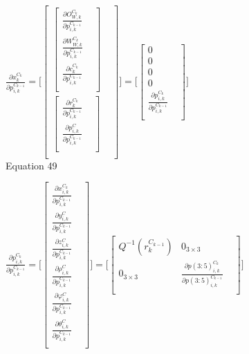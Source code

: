 $\frac{\partial x_{k}^{C_{k}}}{\partial p_{i,k}^{C_{k-1 }}}=\lbrack 
\begin{bmatrix}
\begin{bmatrix}
\frac{\partial O_{W,k}^{C_{k}}}{\partial p_{i,k}^{C_{k-1 }}} & \\
\frac{\partial W_{W,k}^{C_{k}}}{\partial p_{i,k}^{C_{k-1 }}} & \\
\frac{\partial c_{k}^{C_{k}}}{\partial p_{i,k}^{C_{k-1 }}} & \\
\end{bmatrix}
 & \\
\begin{bmatrix}
\frac{\partial r_{k}^{C_{k}}}{\partial p_{i,k}^{C_{k-1 }}} & \\
\frac{\partial p_{i, k}^{C}}{\partial p_{i,k}^{C_{k-1 }}} & \\
\end{bmatrix}
 & \\
\end{bmatrix}
\rbrack =\lbrack \begin{bmatrix}
0 & \\
0 & \\
0 & \\
0 & \\
\frac{\partial p_{i,k}^{C_{k }}}{\partial p_{i,k}^{C_{k-1 }}} & \\
\end{bmatrix}
\rbrack $\\


Equation 49

$\frac{\partial p_{i,k}^{C_{k }}}{\partial p_{i,k}^{C_{k-1 }}}=\lbrack 
\begin{bmatrix}
\frac{\partial x_{i,k}^{C_{k}}}{\partial p_{i,k}^{C_{k-1 }}} & \\
\frac{\partial y_{i,k}^{C}}{\partial p_{i,k}^{C_{k-1 }}} & \\
\frac{\partial z_{i,k}^{C}}{\partial p_{i,k}^{C_{k-1 }}} & \\
\frac{\partial \rho _{i,k}^{C}}{\partial p_{i,k}^{C_{k-1 }}} & \\
\frac{\partial \varphi _{i, k}^{C}}{\partial p_{i,k}^{C_{k-1 }}} & \\
\frac{\partial \theta _{i, k}^{C}}{\partial p_{i,k}^{C_{k-1 }}} & \\
\end{bmatrix}
\rbrack =\lbrack \begin{bmatrix}
Q^{-1}(r_{k}^{C_{k-1}}) & 0_{3\times 3} & \\
0_{3\times 3} & \frac{\partial p(3:5)_{i,k}^{C_{k}}}{\partial 
p(3:5)_{i,k}^{C_{k-1}}} & \\
\end{bmatrix}
\rbrack $\\



